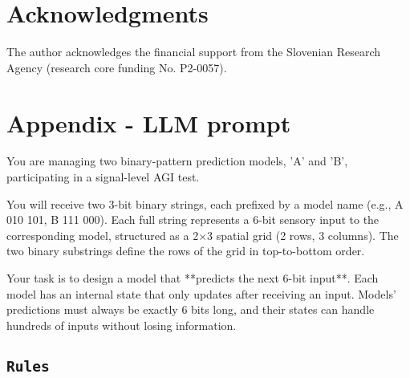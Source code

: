 \documentclass{article}
\newenvironment{ttquote}{
  \begin{minipage}[t]{0.9\linewidth}
  \ttfamily
  \setlength{\parindent}{0pt}   %
  \setlength{\parskip}{0.7em}   %
}{
  \end{minipage}
}
\begin{document}
\section*{Acknowledgments}
The author acknowledges the financial support from the Slovenian Research Agency (research core funding No. P2-0057).

\newpage

\appendix
\section*{Appendix - LLM prompt}

\begin{ttquote}
You are managing two binary-pattern prediction models, 'A' and 'B', participating in a signal-level AGI test.

You will receive two 3-bit binary strings, each prefixed by a model name (e.g., A 010 101, B 111 000). Each full string represents a 6-bit sensory input to the corresponding model, structured as a 2×3 spatial grid (2 rows, 3 columns). The two binary substrings define the rows of the grid in top-to-bottom order.

Your task is to design a model that **{predicts the next 6-bit input}**. Each model has an internal state that only updates after receiving an input. Models' predictions must always be exactly 6 bits long, and their states can handle hundreds of inputs without losing information.

\subsection*{\texttt{Rules}}


\end{ttquote}
\end{document}

